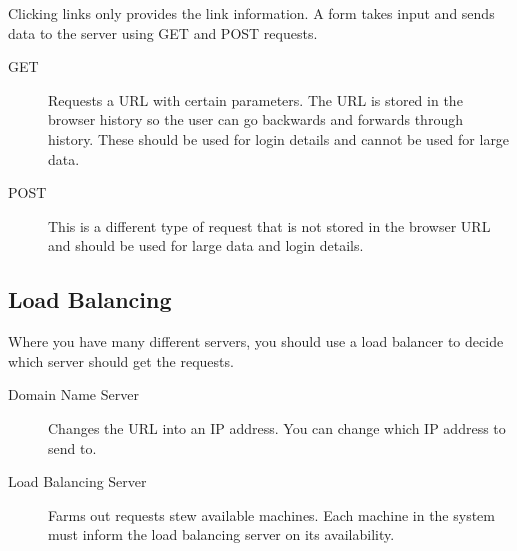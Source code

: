 Clicking links only provides the link information.
A form takes input and sends data to the server using GET and POST requests.

\begin{description}
	\item[GET] Requests a URL with certain parameters.
		The URL is stored in the browser history so the user can go backwards and forwards through history.
		These should be used for login details and cannot be used for large data.
	\item[POST] This is a different type of request that is not stored in the browser URL and should be used for large data and login details.
\end{description}

\subsection{Load Balancing}\label{sub:load_balancing}

Where you have many different servers, you should use a load balancer to decide which server should get the requests.
\begin{description}
	\item[Domain Name Server] Changes the URL into an IP address.
		You can change which IP address to send to.
	\item[Load Balancing Server] Farms out requests stew available machines.
		Each machine in the system must inform the load balancing server on its availability.
\end{description}


